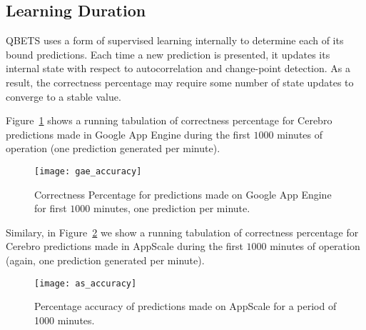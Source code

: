 \subsection{Learning Duration}

QBETS uses a form of supervised learning internally to determine each of its
bound predictions.  Each time a new prediction is presented, it updates its
internal state with respect to autocorrelation and change-point detection.  As
a result, the correctness percentage may require some number of state updates
to converge to a stable value.


Figure~\ref{fig:gae_accuracy} shows a running tabulation of
correctness percentage for Cerebro
predictions made in Google App Engine during the first 
$1000$ minutes of operation (one prediction generated per minute). 
\begin{figure}
\centering
\texttt{[image: gae\_accuracy]}
\caption{Correctness Percentage for predictions made on Google App 
Engine for first $1000$ minutes, one prediction per minute.}
\label{fig:gae_accuracy}
\end{figure}
Similary, in Figure~\ref{fig:as_accuracy} we show a running tabulation of
correctness percentage for Cerebro
predictions made in AppScale during the first 
$1000$ minutes of operation (again, one prediction generated per minute). 
\begin{figure}
\centering
\texttt{[image: as\_accuracy]}
\caption{Percentage accuracy of predictions made on AppScale for a period of 1000 minutes.}
\label{fig:as_accuracy}
\end{figure}

